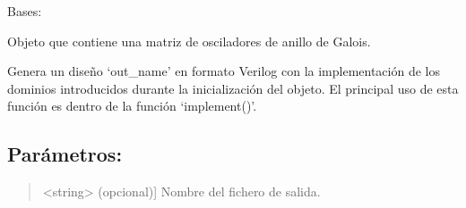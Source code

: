 \documentclass[letterpaper,10pt,english]{sphinxmanual}
\begin{document}

\begin{fulllineitems}
\label{\detokenize{myfpga:myfpga.ring_osc.GaloisMatrix}}
\pysigstartsignatures
{}
\pysigstopsignatures
\sphinxAtStartPar
Bases: 

\sphinxAtStartPar
Objeto que contiene una matriz de osciladores de anillo de Galois.

\begin{fulllineitems}
\label{\detokenize{myfpga:myfpga.ring_osc.GaloisMatrix.gen_garomatrix}}
\pysigstartsignatures
{}
\pysigstopsignatures
\sphinxAtStartPar
Genera un diseño ‘out\_name’ en formato Verilog con la implementación de 
los dominios introducidos durante la inicialización del objeto. El 
principal uso de esta función es dentro de la función ‘implement()’.


\subsection{Parámetros:}
\label{\detokenize{myfpga:parametros}}\begin{quote}
\begin{description}
\sphinxlineitem{out\_name}{[}\textless{}string\textgreater{} (opcional){]}
\sphinxAtStartPar
Nombre del fichero de salida.

\end{description}
\end{quote}


\end{fulllineitems}
\end{fulllineitems}
\end{document}
